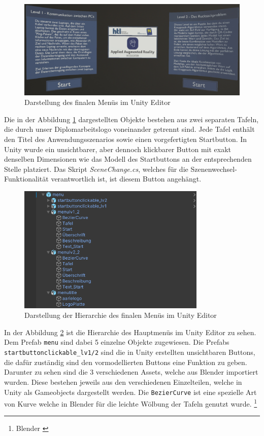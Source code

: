 \begin{figure}[H]
    \centering
    \includegraphics[width=1\textwidth]{images/menuversion2.png}
    \caption{Darstellung des finalen Menüs im Unity Editor}
    \label{fig:menuversion2}
\end{figure}

Die in der Abbildung \ref{fig:menuversion2} dargestellten Objekte bestehen aus zwei separaten Tafeln, die durch unser Diplomarbeitslogo voneinander getrennt sind. Jede Tafel enthält den Titel des Anwendungsszenarios sowie einen vorgefertigten Startbutton.  In Unity wurde ein unsichtbarer, aber dennoch klickbarer Button mit exakt denselben Dimensionen wie das Modell des Startbuttons an der entsprechenden Stelle platziert. Das Skript \textit{SceneChange.cs}, welches für die Szenenwechsel-Funktionalität verantwortlich ist, ist diesem Button angehängt.

\begin{figure}[H]
    \centering
    \includegraphics[width=0.8\textwidth]{images/hierarchiemenuunity.png}
    \caption{Darstellung der Hierarchie des finalen Menüs im Unity Editor}
    \label{fig:hierarchiemenuunity}
\end{figure}

In der Abbildung \ref{fig:hierarchiemenuunity} ist die Hierarchie des Hauptmenüs im Unity Editor zu sehen. Dem Prefab \texttt{menu} sind dabei 5 einzelne Objekte zugewiesen. Die Prefabs \texttt{startbuttonclickable\_lv1/2} sind die in Unity erstellten unsichtbaren Buttons, die dafür zuständig sind den vormodellierten Buttons eine Funktion zu geben. Darunter zu sehen sind die 3 verschiedenen Assets, welche aus Blender importiert wurden. Diese bestehen jeweils aus den verschiedenen Einzelteilen, welche in Unity als Gameobjects dargestellt werden. Die \texttt{BezierCurve} ist eine spezielle Art von Kurve welche in Blender für die leichte Wölbung der Tafeln genutzt wurde. \footnote{Blender \cite{Bezier Curve}}

